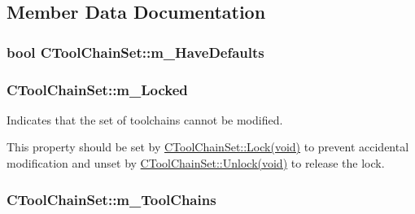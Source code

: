 \subsection{Member Data Documentation}
\hypertarget{classCToolChainSet_aff78567e6f6acc76f0ef60b7afdd5ea8}{
\subsubsection[{m\-\_\-\-Have\-Defaults}]{\setlength{\rightskip}{0pt plus 5cm}bool C\-Tool\-Chain\-Set\-::m\-\_\-\-Have\-Defaults\hspace{0.3cm}{\ttfamily [private]}}}\label{classCToolChainSet_aff78567e6f6acc76f0ef60b7afdd5ea8}
\hypertarget{classCToolChainSet_ad1825a1171045260dfdcf6ce7195680a}{
\subsubsection[{m\-\_\-\-Locked}]{\setlength{\rightskip}{0pt plus 5cm}C\-Tool\-Chain\-Set\-::m\-\_\-\-Locked\hspace{0.3cm}{\ttfamily [private]}}}\label{classCToolChainSet_ad1825a1171045260dfdcf6ce7195680a}


Indicates that the set of toolchains cannot be modified. 

This property should be set by \hyperlink{classCToolChainSet_a6f7c3e3755a389cc7ecb326bec26e399}{C\-Tool\-Chain\-Set\-::\-Lock(void)} to prevent accidental modification and unset by \hyperlink{classCToolChainSet_a09cd759de5503ee0e4f46eb72de0a146}{C\-Tool\-Chain\-Set\-::\-Unlock(void)} to release the lock. \hypertarget{classCToolChainSet_afb74ad132fb56b1fb9e4cc3baf11283a}{
\subsubsection[{m\-\_\-\-Tool\-Chains}]{\setlength{\rightskip}{0pt plus 5cm}C\-Tool\-Chain\-Set\-::m\-\_\-\-Tool\-Chains\hspace{0.3cm}{\ttfamily [private]}}}\label{classCToolChainSet_afb74ad132fb56b1fb9e4cc3baf11283a}


